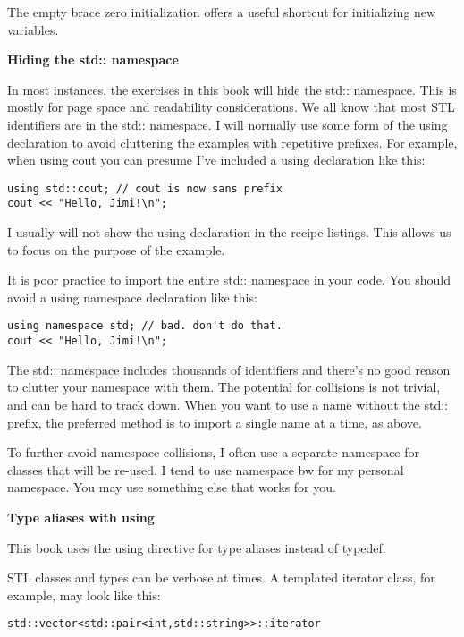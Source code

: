 The empty brace zero initialization offers a useful shortcut for initializing new variables.

\noindent
\textbf{Hiding the std:: namespace}

In most instances, the exercises in this book will hide the std:: namespace. This is mostly for page space and readability considerations. We all know that most STL identifiers are in the std:: namespace. I will normally use some form of the using declaration to avoid cluttering the examples with repetitive prefixes. For example, when using cout you can presume I've included a using declaration like this:

\begin{lstlisting}[style=styleCXX]
using std::cout; // cout is now sans prefix
cout << "Hello, Jimi!\n";
\end{lstlisting}

I usually will not show the using declaration in the recipe listings. This allows us to focus on the purpose of the example.

It is poor practice to import the entire std:: namespace in your code. You should avoid a using namespace declaration like this:

\begin{lstlisting}[style=styleCXX]
using namespace std; // bad. don't do that.
cout << "Hello, Jimi!\n";
\end{lstlisting}

The std:: namespace includes thousands of identifiers and there's no good reason to clutter your namespace with them. The potential for collisions is not trivial, and can be hard to track down. When you want to use a name without the std:: prefix, the preferred method is to import a single name at a time, as above.

To further avoid namespace collisions, I often use a separate namespace for classes that will be re-used. I tend to use namespace bw for my personal namespace. You may use something else that works for you.

\noindent
\textbf{Type aliases with using}

This book uses the using directive for type aliases instead of typedef.

STL classes and types can be verbose at times. A templated iterator class, for example, may look like this:

\begin{lstlisting}[style=styleCXX]
std::vector<std::pair<int,std::string>>::iterator
\end{lstlisting}

